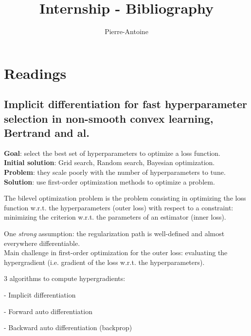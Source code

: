 \documentclass[a4paper,10pt]{article}
\author{Pierre-Antoine}
\title{Internship - Bibliography}
\theoremstyle{definition}
\begin{document}
\maketitle

\vskip 0.3in

\section{Readings}

\subsection{Implicit differentiation for fast hyperparameter selection in non-smooth convex learning, Bertrand and al.}

\textbf{Goal}: select the best set of hyperparameters to optimize a loss function. \\
\textbf{Initial solution}: Grid search, Random search, Bayesian optimization. \\
\textbf{Problem}: they scale poorly with the number of hyperparameters to tune. \\
\textbf{Solution}: use first-order optimization methods to optimize a problem. \\

\vskip 0.1in

The bilevel optimization problem is the problem consisting in optimizing the loss function w.r.t. the hyperparameters (outer loss)
with respect to a constraint: minimizing the criterion w.r.t. the parameters  of an estimator (inner loss).

\vskip 0.1in

One \textit{strong} assumption: the regularization path is well-defined and almost everywhere differentiable.\\
Main challenge in first-order optimization for the outer loss: evaluating the hypergradient (i.e. gradient of the loss w.r.t. the hyperparameters).

\vskip 0.1in 

3 algorithms to compute hypergradients:
\begin{list}{}{}
    \item - Implicit differentiation
    \item - Forward auto differentiation
    \item - Backward auto differentiation (backprop)
\end{list}

\vskip 0.1in
\end{document}
